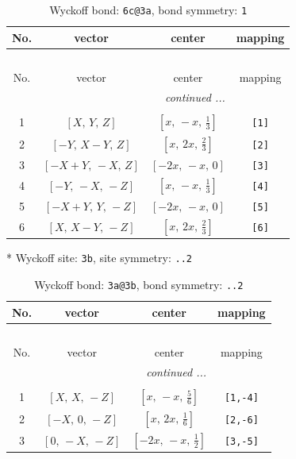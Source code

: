 \documentclass[fleqn,8pt]{jsarticle}
\begin{document}
\renewcommand{\arraystretch}{1.2}
\begin{longtable}{cccc}
\caption{Wyckoff bond: {\tt 6c@3a}, bond symmetry: {\tt 1}}
 \\
 \hline \hline
No. & vector & center & mapping \\ \hline \endfirsthead

\multicolumn{3}{l}{\tablename\ \thetable{}} \\
 \hline \hline
No. & vector & center & mapping \\ \hline \endhead

 \hline \hline
\multicolumn{3}{r}{\footnotesize\it continued ...} \\ \endfoot

 \hline \hline
\multicolumn{3}{r}{} \\ \endlastfoot

1 & $\left[ X,\, Y,\, Z \right]$ & $\left[ x,\, - x,\, \frac{1}{3} \right]$ & {\tt [1]} \\ \hline
2 & $\left[ - Y,\, X - Y,\, Z \right]$ & $\left[ x,\, 2 x,\, \frac{2}{3} \right]$ & {\tt [2]} \\ \hline
3 & $\left[ - X + Y,\, - X,\, Z \right]$ & $\left[ - 2 x,\, - x,\, 0 \right]$ & {\tt [3]} \\ \hline
4 & $\left[ - Y,\, - X,\, - Z \right]$ & $\left[ x,\, - x,\, \frac{1}{3} \right]$ & {\tt [4]} \\ \hline
5 & $\left[ - X + Y,\, Y,\, - Z \right]$ & $\left[ - 2 x,\, - x,\, 0 \right]$ & {\tt [5]} \\ \hline
6 & $\left[ X,\, X - Y,\, - Z \right]$ & $\left[ x,\, 2 x,\, \frac{2}{3} \right]$ & {\tt [6]} \\
\end{longtable}
* Wyckoff site: {\tt 3b}, site symmetry: {\tt ..2}
\renewcommand{\arraystretch}{1.2}
\begin{longtable}{cccc}
\caption{Wyckoff bond: {\tt 3a@3b}, bond symmetry: {\tt ..2}}
 \\
 \hline \hline
No. & vector & center & mapping \\ \hline \endfirsthead

\multicolumn{3}{l}{\tablename\ \thetable{}} \\
 \hline \hline
No. & vector & center & mapping \\ \hline \endhead

 \hline \hline
\multicolumn{3}{r}{\footnotesize\it continued ...} \\ \endfoot

 \hline \hline
\multicolumn{3}{r}{} \\ \endlastfoot

1 & $\left[ X,\, X,\, - Z \right]$ & $\left[ x,\, - x,\, \frac{5}{6} \right]$ & {\tt [1,-4]} \\ \hline
2 & $\left[ - X,\, 0,\, - Z \right]$ & $\left[ x,\, 2 x,\, \frac{1}{6} \right]$ & {\tt [2,-6]} \\ \hline
3 & $\left[ 0,\, - X,\, - Z \right]$ & $\left[ - 2 x,\, - x,\, \frac{1}{2} \right]$ & {\tt [3,-5]} \\
\end{longtable}
\end{document}
